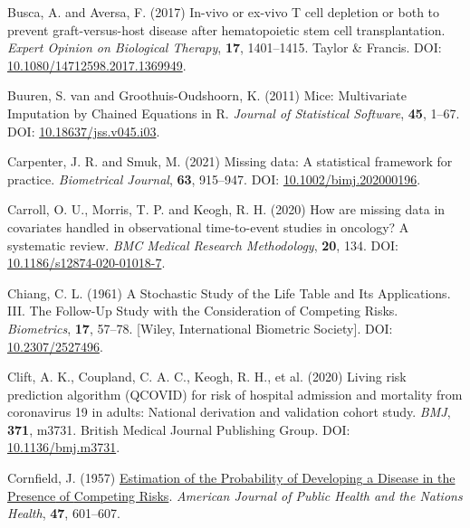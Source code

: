 \documentclass[
  letterpaper,
  DIV=11,
  numbers=noendperiod]{scrreprt}
\newlength{\cslhangindent}
\newlength{\cslentryspacingunit} %
\newenvironment{CSLReferences}[2] %
 {%
  \setlength{\parindent}{0pt}
  \ifodd #1
  \let\oldpar\par
  \def\par{\hangindent=\cslhangindent\oldpar}
  \fi
  \setlength{\parskip}{#2\cslentryspacingunit}
 }%
 {}
\begin{document}
\begin{CSLReferences}{1}{0}
\leavevmode{}%
Busca, A. and Aversa, F. (2017) In-vivo or ex-vivo {T} cell depletion or
both to prevent graft-versus-host disease after hematopoietic stem cell
transplantation. \emph{Expert Opinion on Biological Therapy},
\textbf{17}, 1401--1415. Taylor \& Francis. DOI:
\href{https://doi.org/10.1080/14712598.2017.1369949}{10.1080/14712598.2017.1369949}.

\leavevmode{}%
Buuren, S. van and Groothuis-Oudshoorn, K. (2011) Mice: {Multivariate
Imputation} by {Chained Equations} in {R}. \emph{Journal of Statistical
Software}, \textbf{45}, 1--67. DOI:
\href{https://doi.org/10.18637/jss.v045.i03}{10.18637/jss.v045.i03}.

\leavevmode{}%
Carpenter, J. R. and Smuk, M. (2021) Missing data: {A} statistical
framework for practice. \emph{Biometrical Journal}, \textbf{63},
915--947. DOI:
\href{https://doi.org/10.1002/bimj.202000196}{10.1002/bimj.202000196}.

\leavevmode{}%
Carroll, O. U., Morris, T. P. and Keogh, R. H. (2020) How are missing
data in covariates handled in observational time-to-event studies in
oncology? {A} systematic review. \emph{BMC Medical Research
Methodology}, \textbf{20}, 134. DOI:
\href{https://doi.org/10.1186/s12874-020-01018-7}{10.1186/s12874-020-01018-7}.

\leavevmode{}%
Chiang, C. L. (1961) A {Stochastic Study} of the {Life Table} and {Its
Applications}. {III}. {The Follow-Up Study} with the {Consideration} of
{Competing Risks}. \emph{Biometrics}, \textbf{17}, 57--78. {[}Wiley,
International Biometric Society{]}. DOI:
\href{https://doi.org/10.2307/2527496}{10.2307/2527496}.

\leavevmode{}%
Clift, A. K., Coupland, C. A. C., Keogh, R. H., et al. (2020) Living
risk prediction algorithm ({QCOVID}) for risk of hospital admission and
mortality from coronavirus 19 in adults: National derivation and
validation cohort study. \emph{BMJ}, \textbf{371}, m3731. British
Medical Journal Publishing Group. DOI:
\href{https://doi.org/10.1136/bmj.m3731}{10.1136/bmj.m3731}.

\leavevmode{}%
Cornfield, J. (1957)
\href{https://www.ncbi.nlm.nih.gov/pmc/articles/PMC1551242}{Estimation
of the {Probability} of {Developing} a {Disease} in the {Presence} of
{Competing Risks}}. \emph{American Journal of Public Health and the
Nations Health}, \textbf{47}, 601--607.


\end{CSLReferences}
\end{document}
